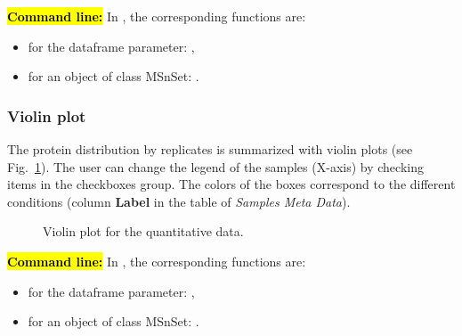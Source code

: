 \documentclass[12pt]{article}
\begin{document}
{%
\hl{\bf Command line:} In , the corresponding functions are:
\begin{itemize}
\item for the dataframe parameter: ,
\item for an object of class MSnSet: .
\end{itemize}



\subsubsection {Violin plot}\label{sec:violinplot}

The protein distribution by replicates is summarized with violin plots 
(see Fig.~\ref{fig:violinplot}). The user can change the legend of the samples 
(X-axis) by checking items in the checkboxes group. The colors of the boxes 
correspond to the different conditions (column \textbf{Label} in the table of 
\emph {Samples Meta Data}).

\begin {figure}
\centering
{}
\caption{Violin plot for the quantitative data.}\label{fig:violinplot}
\end {figure}



\hl{\bf Command line:} In , the corresponding functions are:
\begin{itemize}
\item for the dataframe parameter: ,
\item for an object of class MSnSet: .
\end{itemize}



}
\end{document}

